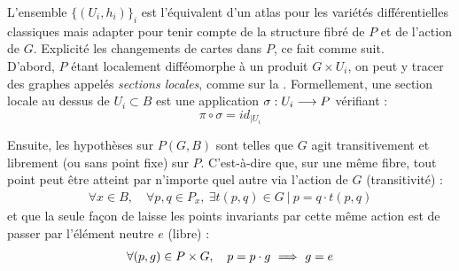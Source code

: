 L'ensemble $\big\{(U_i, h_i)\big\}_i$ est l'équivalent d'un atlas pour les variétés différentielles classiques mais adapter pour tenir compte de la structure fibré de $P$ et de l'action de $G$. Explicité les changements de cartes dans $P$, ce fait comme suit.
\\
D'abord, $P$ étant localement difféomorphe à un produit $G\times U_i$, on peut y tracer des graphes appelés \emph{sections locales}, comme sur la  . Formellement, une section locale au dessus  de $U_i \subset B$ est une application $\sigma : U_i \longrightarrow P$ vérifiant :
\[\pi\circ \sigma = id_{{\displaystyle |}U_i}\]
\begin{figure}[H]
	\begin{floatrow}
	
\end{floatrow}
\end{figure}
\noindent
Ensuite, les hypothèses sur $P(G,B)$ sont telles que $G$ agit transitivement et librement (ou sans point fixe) sur $P$. C'est-à-dire que, sur une même fibre, tout point peut être atteint par n'importe quel autre via l'action de $G$ (transitivité) :
\begin{align*}
	\forall x\in B,\quad \forall p,q\in P_x,\ \exists t(p,q)\in G\ |\ p = q\cdot t(p,q) 
\end{align*}
et que la seule façon de laisse les points invariants par cette même action est de passer par l'élément neutre $e$ (libre) :
\begin{align*}
	\forall (p,g)\in P\times G,\quad p = p\cdot g\ \Longrightarrow\ g=e
\end{align*}
